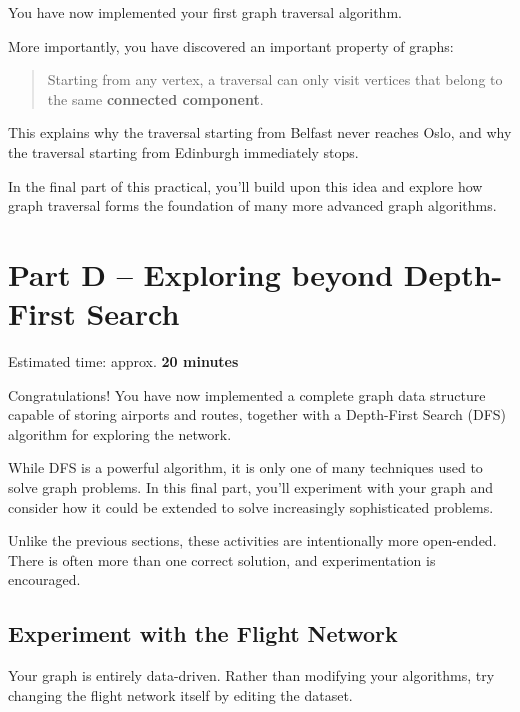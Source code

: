 \documentclass{csc2059practical}
\begin{document}
You have now implemented your first graph traversal algorithm.

More importantly, you have discovered an important property of graphs:

\begin{quote}
Starting from any vertex, a traversal can only visit vertices that belong to the same \textbf{connected component}.
\end{quote}

This explains why the traversal starting from Belfast never reaches Oslo, and why the traversal starting from Edinburgh immediately stops.

In the final part of this practical, you'll build upon this idea and explore how graph traversal forms the foundation of many more advanced graph algorithms.

\section{Part D -- Exploring beyond Depth-First Search}
\begin{infobox}
Estimated time: approx. \textbf{20 minutes}
\end{infobox}

Congratulations! You have now implemented a complete graph data structure capable of storing airports and routes, together with a Depth-First Search (DFS) algorithm for exploring the network.

While DFS is a powerful algorithm, it is only one of many techniques used to solve graph problems. In this final part, you'll experiment with your graph and consider how it could be extended to solve increasingly sophisticated problems.

Unlike the previous sections, these activities are intentionally more open-ended. There is often more than one correct solution, and experimentation is encouraged.

\subsection{Experiment with the Flight Network}

Your graph is entirely data-driven. Rather than modifying your algorithms, try changing the flight network itself by editing the dataset.
\end{document}
